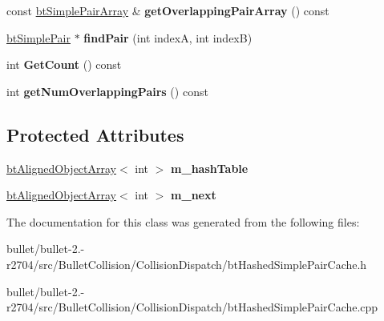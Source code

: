 \begin{DoxyCompactItemize}
\item 
\hypertarget{classbt_hashed_simple_pair_cache_a7244b015bffe81ac7ba69c8b30a91a81}{const \hyperlink{classbt_aligned_object_array}{bt\+Simple\+Pair\+Array} \& {\bfseries get\+Overlapping\+Pair\+Array} () const }\label{classbt_hashed_simple_pair_cache_a7244b015bffe81ac7ba69c8b30a91a81}

\item 
\hypertarget{classbt_hashed_simple_pair_cache_ad65d327383a0114f03a7d585119c9f59}{\hyperlink{structbt_simple_pair}{bt\+Simple\+Pair} $\ast$ {\bfseries find\+Pair} (int index\+A, int index\+B)}\label{classbt_hashed_simple_pair_cache_ad65d327383a0114f03a7d585119c9f59}

\item 
\hypertarget{classbt_hashed_simple_pair_cache_a65205ee21cf0d7d606644aaf6c18ec99}{int {\bfseries Get\+Count} () const }\label{classbt_hashed_simple_pair_cache_a65205ee21cf0d7d606644aaf6c18ec99}

\item 
\hypertarget{classbt_hashed_simple_pair_cache_aaefc7624dd57dd08d364bfd1549f9508}{int {\bfseries get\+Num\+Overlapping\+Pairs} () const }\label{classbt_hashed_simple_pair_cache_aaefc7624dd57dd08d364bfd1549f9508}

\end{DoxyCompactItemize}
\subsection*{Protected Attributes}
\begin{DoxyCompactItemize}
\item 
\hypertarget{classbt_hashed_simple_pair_cache_a55b5a02b34c6c0580eae221bbf5bf305}{\hyperlink{classbt_aligned_object_array}{bt\+Aligned\+Object\+Array}$<$ int $>$ {\bfseries m\+\_\+hash\+Table}}\label{classbt_hashed_simple_pair_cache_a55b5a02b34c6c0580eae221bbf5bf305}

\item 
\hypertarget{classbt_hashed_simple_pair_cache_a8ea0a84f8bd3853e415d2ad4dbf5e822}{\hyperlink{classbt_aligned_object_array}{bt\+Aligned\+Object\+Array}$<$ int $>$ {\bfseries m\+\_\+next}}\label{classbt_hashed_simple_pair_cache_a8ea0a84f8bd3853e415d2ad4dbf5e822}

\end{DoxyCompactItemize}


The documentation for this class was generated from the following files\+:\begin{DoxyCompactItemize}
\item 
bullet/bullet-\/2.-\/r2704/src/\+Bullet\+Collision/\+Collision\+Dispatch/bt\+Hashed\+Simple\+Pair\+Cache.\+h\item 
bullet/bullet-\/2.-\/r2704/src/\+Bullet\+Collision/\+Collision\+Dispatch/bt\+Hashed\+Simple\+Pair\+Cache.\+cpp\end{DoxyCompactItemize}
